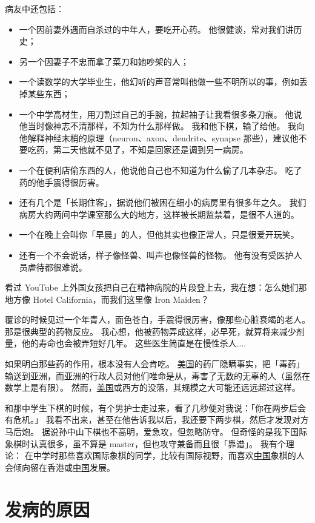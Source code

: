 \documentclass[12pt]{report}
\begin{document}
病友中还包括：
\begin{itemize}
\item 一个因前妻外遇而自杀过的中年人，要吃开心药。 他很健谈，常对我们讲历史；
\item 另一个因妻子不忠而拿了菜刀和她吵架的人；
\item 一个读数学的大学毕业生，他幻听的声音常叫他做一些不明所以的事，例如丢掉某些东西；
\item 一个中学高材生，用刀割过自己的手腕，拉起袖子让我看很多条刀痕。 他说他当时像神志不清那样，不知为什么那样做。 我和他下棋，输了给他。 我向他解释神经末梢的原理（neuron、axon、dendrite、synapse 那些），建议他不要吃药，第二天他就不见了，不知是回家还是调到另一病房。
\item 一个在便利店偷东西的人，他说他自己也不知道为什么偷了几本杂志。 吃了药的他手震得很厉害。
\item 还有几个是「长期住客」，据说他们被困在细小的病房里有很多年之久。 我们病房大约两间中学课室那么大的地方，这样被长期监禁着，是很不人道的。
\item 一个在晚上会叫你「早晨」的人，但他其实也像正常人，只是很爱开玩笑。
\item 还有一个不会说话，样子像怪兽、叫声也像怪兽的怪物。 他有没有受医护人员虐待都很难说。
\end{itemize}

看过 YouTube 上外国女孩把自己在精神病院的片段登上去，我在想：怎么她们那地方像 Hotel California，而我们这里像 Iron Maiden？

覆诊的时候见过一个年青人，面色苍白，手震得很厉害，像那些心脏衰竭的老人。 那是很典型的药物反应。 我心想，他被药物弄成这样，必早死，就算将来减少剂量，他的寿命也会被弄短好几年。 这些医生简直是在慢性杀人....

如果明白那些药的作用，根本没有人会肯吃。 \uline{美国}的药厂隐瞒事实，把「毒药」输送到亚洲，而亚洲的行政人员对他们唯命是从，毒害了无数的无辜的人（虽然在数学上是有限）。 然而，\uline{美国}或西方的没落，其规模之大可能还远远超过这样。

和那中学生下棋的时候，有个男护士走过来，看了几秒便对我说：「你在两步后会有危机。」 我看不出来，甚至在他告诉我以后，我还要下两步棋，然后才发现对方马后炮。 据说孙中山下棋也不高明，爱急攻，但忽略防守。 但奇怪的是我下国际象棋时认真很多，虽不算是 master，但也攻守兼备而且很「靠谱」。 我有个理论： 在中学时那些喜欢国际象棋的同学，比较有国际视野，而喜欢\uline{中国}象棋的人会倾向留在香港或\uline{中国}发展。

\chapter{发病的原因}
\label{cause-of-illness}
\end{document}
